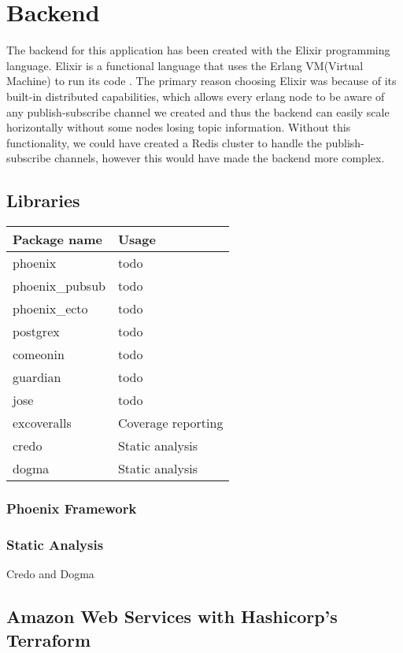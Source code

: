 \documentclass[11pt,a4paper]{report}
\begin{document}
\section{Backend}

The backend for this application has been created with the Elixir programming language. Elixir is a functional language that uses the Erlang VM(Virtual Machine) to run its code \cite{website:elixir_homepage}. The primary reason choosing Elixir was because of its built-in distributed capabilities, which allows every erlang node to be aware of any publish-subscribe channel we created and thus the backend can easily scale horizontally without some nodes losing topic information. Without this functionality, we could have created a Redis cluster to handle the publish-subscribe channels, however this would have made the backend more complex.

\subsection{Libraries}

\begin{tabular}{ | l | p{11cm} |}
  \hline Package name & Usage \\ \hline
  phoenix & todo \\
  phoenix\_pubsub & todo \\
  phoenix\_ecto & todo \\ \hline
  postgrex & todo \\
  comeonin & todo \\
  guardian & todo \\
  jose & todo \\ \hline
  excoveralls & Coverage reporting \\
  credo & Static analysis \\
  dogma & Static analysis \\
  \hline
\end{tabular}

\subsubsection{Phoenix Framework}


\subsubsection{Static Analysis}

Credo and Dogma

\subsection{Amazon Web Services with Hashicorp's Terraform}
\end{document}
